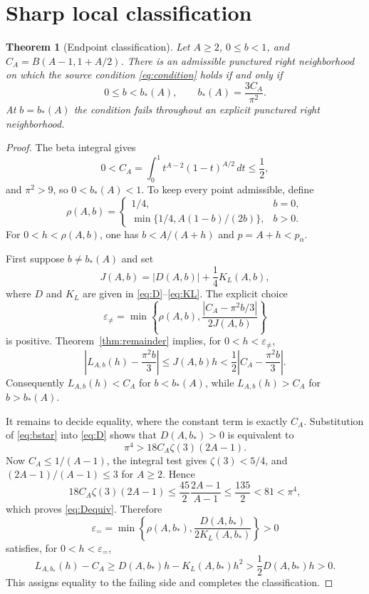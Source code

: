 \documentclass[11pt]{article}
\newtheorem{theorem}{Theorem}
\theoremstyle{remark}
\newcommand{\eps}{\varepsilon}
\begin{document}
\section{Sharp local classification}

\begin{theorem}[Endpoint classification]\label{thm:classification}
Let $A\geq2$, $0\leq b<1$, and $C_A=B(A-1,1+A/2)$.  There is an
admissible punctured right neighborhood on which the source condition
\eqref{eq:condition} holds if and only if
\begin{equation}
 0\leq b< b_*(A),\qquad b_*(A)=\frac{3C_A}{\pi^2}.        \label{eq:bstar}
\end{equation}
At $b=b_*(A)$ the condition fails throughout an explicit punctured right
neighborhood.
\end{theorem}

\begin{proof}
The beta integral gives
\[
 0<C_A=\int_0^1t^{A-2}(1-t)^{A/2}\,dt\leq\frac12,
\]
and $\pi^2>9$, so $0<b_*(A)<1$.  To keep every point admissible, define
\begin{equation}
 \rho(A,b)=
 \begin{cases}
  1/4,&b=0,\\[2mm]
  \min\{1/4,A(1-b)/(2b)\},&b>0.
 \end{cases}                                             \label{eq:rho}
\end{equation}
For $0<h<\rho(A,b)$, one has $b<A/(A+h)$ and $p=A+h<p_\alpha$.

First suppose $b\neq b_*(A)$ and set
\[
 J(A,b)=|D(A,b)|+\frac14K_L(A,b),
\]
where $D$ and $K_L$ are given in \eqref{eq:D}--\eqref{eq:KL}.  The explicit
choice
\begin{equation}
 \eps_{\neq}=\min\left\{\rho(A,b),
 \frac{|C_A-\pi^2b/3|}{2J(A,b)}\right\}                 \label{eq:epsneq}
\end{equation}
is positive.  Theorem~\ref{thm:remainder} implies, for
$0<h<\eps_{\neq}$,
\[
 \left|L_{A,b}(h)-\frac{\pi^2b}{3}\right|
 \leq J(A,b)h<\frac12\left|C_A-\frac{\pi^2b}{3}\right|.
\]
Consequently $L_{A,b}(h)<C_A$ for $b<b_*(A)$, while
$L_{A,b}(h)>C_A$ for $b>b_*(A)$.

It remains to decide equality, where the constant term is exactly $C_A$.
Substitution of \eqref{eq:bstar} into \eqref{eq:D} shows that
$D(A,b_*)>0$ is equivalent to
\begin{equation}
 \pi^4>18C_A\zeta(3)(2A-1).                              \label{eq:Dequiv}
\end{equation}
Now $C_A\leq1/(A-1)$, the integral test gives $\zeta(3)<5/4$, and
$(2A-1)/(A-1)\leq3$ for $A\geq2$.  Hence
\[
 18C_A\zeta(3)(2A-1)
 \leq\frac{45}{2}\frac{2A-1}{A-1}
 \leq\frac{135}{2}<81<\pi^4,
\]
which proves \eqref{eq:Dequiv}.  Therefore
\begin{equation}
 \eps_{=}=\min\left\{\rho(A,b_*),
 \frac{D(A,b_*)}{2K_L(A,b_*)}\right\}>0                \label{eq:epseq}
\end{equation}
satisfies, for $0<h<\eps_{=}$,
\[
 L_{A,b_*}(h)-C_A
 \geq D(A,b_*)h-K_L(A,b_*)h^2
 >\frac12D(A,b_*)h>0.
\]
This assigns equality to the failing side and completes the classification.
\end{proof}
\end{document}
